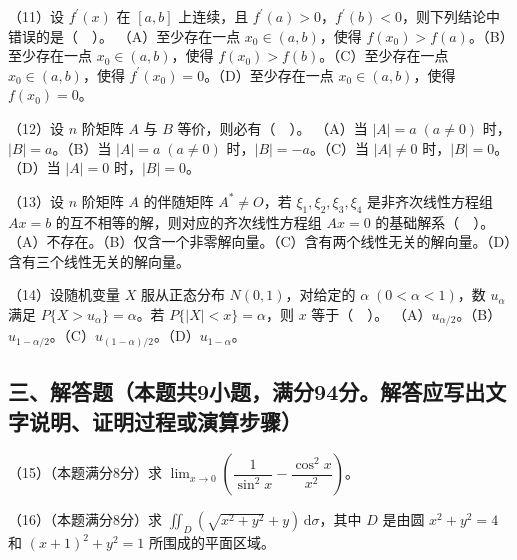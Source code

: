 \documentclass[UTF8,12pt]{ctexart}
\begin{document}
（11）设 \(\displaystyle f^{\prime}(x)\) 在 \(\displaystyle [a,\allowbreak b]\) 上连续，且 \(\displaystyle f^{\prime}(a)>0\)，\(\displaystyle f^{\prime}(b)<0\)，则下列结论中错误的是（　）。
（A）至少存在一点 \(\displaystyle x_0\in(a,\allowbreak b)\)，使得 \(\displaystyle f(x_0)>f(a)\)。（B）至少存在一点 \(\displaystyle x_0\in(a,\allowbreak b)\)，使得 \(\displaystyle f(x_0)>f(b)\)。（C）至少存在一点 \(\displaystyle x_0\in(a,\allowbreak b)\)，使得 \(\displaystyle f^{\prime}(x_0)=0\)。（D）至少存在一点 \(\displaystyle x_0\in(a,\allowbreak b)\)，使得 \(\displaystyle f(x_0)=0\)。


（12）设 \(\displaystyle n\) 阶矩阵 \(\displaystyle A\) 与 \(\displaystyle B\) 等价，则必有（　）。
（A）当 \(\displaystyle |A|=a\;(a\ne0)\) 时，\(\displaystyle |B|=a\)。（B）当 \(\displaystyle |A|=a\;(a\ne0)\) 时，\(\displaystyle |B|=-a\)。（C）当 \(\displaystyle |A|\ne0\) 时，\(\displaystyle |B|=0\)。（D）当 \(\displaystyle |A|=0\) 时，\(\displaystyle |B|=0\)。


（13）设 \(\displaystyle n\) 阶矩阵 \(\displaystyle A\) 的伴随矩阵 \(\displaystyle A^*\ne O\)，若 \(\displaystyle \xi_1,\allowbreak \xi_2,\allowbreak \xi_3,\allowbreak \xi_4\) 是非齐次线性方程组 \(\displaystyle Ax=b\) 的互不相等的解，则对应的齐次线性方程组 \(\displaystyle Ax=0\) 的基础解系（　）。
（A）不存在。（B）仅含一个非零解向量。（C）含有两个线性无关的解向量。（D）含有三个线性无关的解向量。


（14）设随机变量 \(\displaystyle X\) 服从正态分布 \(\displaystyle N(0,\allowbreak 1)\)，对给定的 \(\displaystyle \alpha\;(0<\alpha<1)\)，数 \(\displaystyle u_\alpha\) 满足 \(\displaystyle P\{X>u_\alpha\}=\alpha\)。若 \(\displaystyle P\{|X|<x\}=\alpha\)，则 \(\displaystyle x\) 等于（　）。
（A）\(\displaystyle u_{\alpha/2}\)。（B）\(\displaystyle u_{1-\alpha/2}\)。（C）\(\displaystyle u_{(1-\alpha)/2}\)。（D）\(\displaystyle u_{1-\alpha}\)。


\subsection*{三、解答题（本题共9小题，满分94分。解答应写出文字说明、证明过程或演算步骤）}

（15）（本题满分8分）求 \(\displaystyle \lim_{x\to0}\left(\dfrac{\displaystyle 1}{\displaystyle \sin^2x}-\dfrac{\displaystyle \cos^2x}{\displaystyle x^2}\right)\)。


（16）（本题满分8分）求 \(\displaystyle \iint_D(\sqrt{x^2+y^2}+y)\,\mathrm d\sigma\)，其中 \(\displaystyle D\) 是由圆 \(\displaystyle x^2+y^2=4\) 和 \(\displaystyle (x+1)^2+y^2=1\) 所围成的平面区域。
\end{document}
